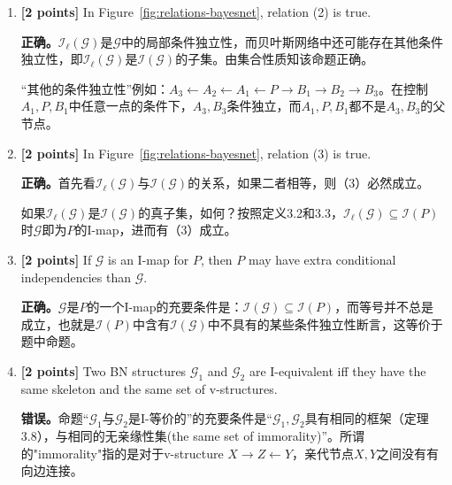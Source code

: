 \documentclass[12pt]{article}
\newcommand{\Gcal}{\mathcal{G}}
\newcommand{\Ical}{\mathcal{I}}
\begin{document}
\begin{enumerate}
\begin{solution}
	      \end{solution}

	\item \textbf{[2 points]} In Figure~\ref{fig:relations-bayesnet}, relation (2) is true.
	      \begin{solution}
		      \textbf{正确。}$\Ical_{\ell}(\Gcal)$是$\Gcal$中的局部条件独立性，而贝叶斯网络中还可能存在其他条件独立性，即$\Ical_{\ell}(\Gcal)$是$\Ical(\Gcal)$的子集。由集合性质知该命题正确。

		      “其他的条件独立性”例如：$A_3 \leftarrow A_2 \leftarrow A_1 \leftarrow P \rightarrow B_1 \rightarrow B_2 \rightarrow B_3$。在控制$A_1, P, B_1$中任意一点的条件下，$A_3, B_3$条件独立，而$A_1, P, B_1$都不是$A_3, B_3$的父节点。

	      \end{solution}



	\item \textbf{[2 points]} In Figure~\ref{fig:relations-bayesnet}, relation (3) is true.

	      \begin{solution}
		      \textbf{正确。}首先看$\Ical_{\ell}(\Gcal)$与$\Ical(\Gcal)$的关系，如果二者相等，则（3）必然成立。

		      如果$\Ical_{\ell}(\Gcal)$是$\Ical(\Gcal)$的真子集，如何？按照定义3.2和3.3，$\Ical_{\ell}(\Gcal) \subseteq \Ical(P)$时$\Gcal$即为$P$的I-map，进而有（3）成立。
	      \end{solution}

	\item \textbf{[2 points]} If $ \Gcal $ is an I-map for $ P $, then $ P $ may have extra conditional independencies than $ \Gcal $.

	      \begin{solution}
		      \textbf{正确。}$\Gcal$是$P$的一个I-map的充要条件是：$\Ical(\Gcal) \subseteq \Ical(P)$，而等号并不总是成立，也就是$\Ical(P)$中含有$\Ical(\Gcal)$中不具有的某些条件独立性断言，这等价于题中命题。
	      \end{solution}


	\item \textbf{[2 points]} Two BN structures $ \Gcal_1 $ and $ \Gcal_2 $ are I-equivalent iff they have the same skeleton and the same set of v-structures.

	      \begin{solution}
		      \textbf{错误。}命题“$\Gcal_1$与$\Gcal_2$是I-等价的”的充要条件是“$\Gcal_1, \Gcal_2$具有相同的框架（定理3.8），与相同的无亲缘性集(the same set of immorality)”。所谓的"immorality"指的是对于v-structure $X \rightarrow Z \leftarrow Y$，亲代节点$X,Y$之间没有有向边连接。
	      \end{solution}


\end{enumerate}
\end{document}

